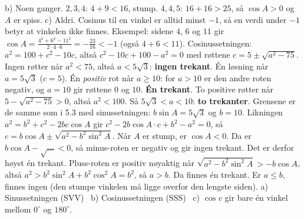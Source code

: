 b) Noen ganger. $2, 3, 4$: $4 + 9 < 16$, stump. $4, 4, 5$: $16 + 16 > 25$, så $\cos A > 0$ og $A$ er spiss.
c) Aldri. Cosinus til en vinkel er alltid minst $-1$, så en verdi under $-1$ betyr at vinkelen ikke finnes. Eksempel: sidene $4$, $6$ og $11$ gir $\cos A = \frac{4^2 + 6^2 - 11^2}{2\cdot4\cdot6} = -\frac{23}{16} < -1$ (også $4 + 6 < 11$).
 Cosinussetningen: $a^2 = 100 + c^2 - 10c$, altså $c^2 - 10c + 100 - a^2 = 0$ med røttene $c = 5 \pm \sqrt{a^2 - 75}$.
Ingen røtter når $a^2 < 75$, altså $a < 5\sqrt3$: \textbf{ingen trekant}.
Én løsning når $a = 5\sqrt3$ ($c = 5$). Én \emph{positiv} rot når $a \ge 10$: for $a > 10$ er den andre roten negativ, og $a = 10$ gir røttene $0$ og $10$. \textbf{Én trekant}.
To positive røtter når $5 - \sqrt{a^2 - 75} > 0$, altså $a^2 < 100$. Så $5\sqrt3 < a < 10$: \textbf{to trekanter}. Grensene er de samme som i 5.3 med sinussetningen: $b\sin A = 5\sqrt3$ og $b = 10$.
 Likningen $a^2 = b^2 + c^2 - 2bc\cos A$ gir $c^2 - 2b\cos A\cdot c + b^2 - a^2 = 0$, så $c = b\cos A \pm \sqrt{a^2 - b^2\sin^2 A}$.
Når $A$ er stump, er $\cos A < 0$. Da er $b\cos A - \sqrt{\ldots} < 0$, så minus-roten er negativ og gir ingen trekant. Det er derfor høyst én trekant.
Pluss-roten er positiv nøyaktig når $\sqrt{a^2 - b^2\sin^2 A} > -b\cos A$, altså $a^2 > b^2\sin^2 A + b^2\cos^2 A = b^2$, så $a > b$. Da finnes én trekant. Er $a \le b$, finnes ingen (den stumpe vinkelen må ligge overfor den lengste siden).
 a) Sinussetningen (SVV) \ b) Cosinussetningen (SSS) \ c) $\cos v$ gir bare én vinkel mellom $0^\circ$ og $180^\circ$.

